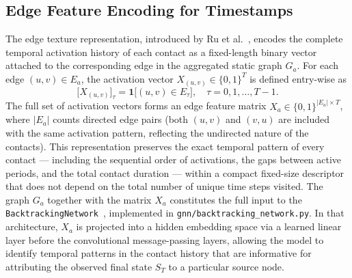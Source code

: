 \subsection{Edge Feature Encoding for Timestamps}
\label{ssst:featureencoding}
The edge texture representation, introduced by Ru et al.~\cite{Ru2023}, encodes the complete temporal activation history of each contact as a fixed-length binary vector attached to the corresponding edge in the aggregated static graph $G_a$. For each edge $(u,v) \in E_a$, the activation vector $X_{(u,v)} \in \{0,1\}^T$ is defined entry-wise as
\[
    \bigl[X_{(u,v)}\bigr]_\tau = \mathbf{1}\bigl[(u,v) \in E_\tau\bigr], \quad \tau = 0, 1, \ldots, T-1.
\]
The full set of activation vectors forms an edge feature matrix $X_a \in \{0,1\}^{|E_a| \times T}$, where $|E_a|$ counts directed edge pairs (both $(u,v)$ and $(v,u)$ are included with the same activation pattern, reflecting the undirected nature of the contacts). This representation preserves the exact temporal pattern of every contact — including the sequential order of activations, the gaps between active periods, and the total contact duration — within a compact fixed-size descriptor that does not depend on the total number of unique time steps visited. The graph $G_a$ together with the matrix $X_a$ constitutes the full input to the \texttt{BacktrackingNetwork}~\cite{Ru2023}, implemented in \texttt{gnn/backtracking\_network.py}. In that architecture, $X_a$ is projected into a hidden embedding space via a learned linear layer before the convolutional message-passing layers, allowing the model to identify temporal patterns in the contact history that are informative for attributing the observed final state $S_T$ to a particular source node.

